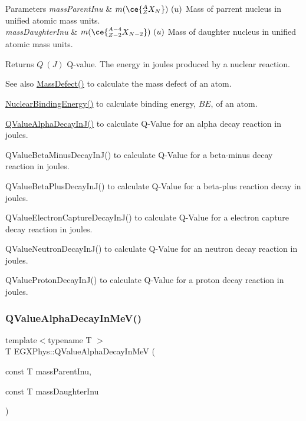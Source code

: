 \begin{DoxyParams}{Parameters}
{\em mass\+Parent\+Inu} & $m(\ce{ ^{A}_{Z}X_{N} })\ (u)$ Mass of parrent nucleus in unified atomic mass units. \\
\hline
{\em mass\+Daughter\+Inu} & $m(\ce{ ^{A-4}_{Z-2}X_{N-2} })\ (u)$ Mass of daughter nucleus in unified atomic mass units. \\
\hline
\end{DoxyParams}
\begin{DoxyReturn}{Returns}
$Q\ (J)$ Q-\/value. The energy in joules produced by a nuclear reaction. 
\end{DoxyReturn}
\begin{DoxySeeAlso}{See also}
\mbox{\hyperlink{group___e_g_x_phys-_mass_defect_gae89f2dfa65992c0314adc2440b2f582a}{Mass\+Defect()}} to calculate the mass defect of an atom. 

\mbox{\hyperlink{group___e_g_x_phys-_nuclear_binding_energy_gab6832bf15ead7b4e867e759e0a2a078e}{Nuclear\+Binding\+Energy()}} to calculate binding energy, $BE$, of an atom. 

\mbox{\hyperlink{_q_value_8hpp_ab8a50c18f6de3c1b6ed280c26c3ff3a5}{Q\+Value\+Alpha\+Decay\+In\+J()}} to calculate Q-\/\+Value for an alpha decay reaction in joules. 

Q\+Value\+Beta\+Minus\+Decay\+In\+J() to calculate Q-\/\+Value for a beta-\/minus decay reaction in joules. 

Q\+Value\+Beta\+Plus\+Decay\+In\+J() to calculate Q-\/\+Value for a beta-\/plus reaction decay in joules. 

Q\+Value\+Electron\+Capture\+Decay\+In\+J() to calculate Q-\/\+Value for a electron capture decay reaction in joules. 

Q\+Value\+Neutron\+Decay\+In\+J() to calculate Q-\/\+Value for an neutron decay reaction in joules. 

Q\+Value\+Proton\+Decay\+In\+J() to calculate Q-\/\+Value for a proton decay reaction in joules. 
\end{DoxySeeAlso}
\mbox{\label{_q_value_8hpp_file_a4f9a38d3ad4bf93471a0affb493b6e72}} 
\subsubsection{\texorpdfstring{Q\+Value\+Alpha\+Decay\+In\+Me\+V()}{QValueAlphaDecayInMeV()}}
{\footnotesize\ttfamily template$<$typename T $>$ \\
T E\+G\+X\+Phys\+::\+Q\+Value\+Alpha\+Decay\+In\+MeV (\begin{DoxyParamCaption}\item[{const T}]{mass\+Parent\+Inu,  }\item[{const T}]{mass\+Daughter\+Inu }\end{DoxyParamCaption})}



